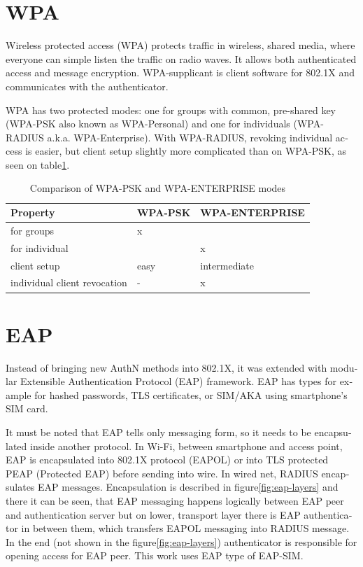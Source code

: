 \documentclass[12pt,a4paper,english]{tutthesis}
\begin{document}
\begin{otherlanguage}{english}
\section{WPA}
\label{sec-2-3}

Wireless protected access (WPA) protects traffic in wireless,
shared media, where everyone can simple listen the traffic on
radio waves. It allows both authenticated access and message
encryption.
WPA-supplicant is client software for 802.1X and communicates with the authenticator.

WPA has two protected modes: one for groups with common, pre-shared
key (WPA-PSK also known as WPA-Personal) and one for individuals
(WPA-RADIUS a.k.a. WPA-Enterprise).  With WPA-RADIUS, revoking
individual access is easier, but client setup slightly more
complicated than on WPA-PSK, as seen on table\ref{psk-enterprise}.

\begin{table}[htb]
\caption{\label{psk-enterprise}Comparison of WPA-PSK and WPA-ENTERPRISE modes}
\centering
\begin{tabular}{lll}
Property & WPA-PSK & WPA-ENTERPRISE\\
\hline
for groups & x & \\
for individual &  & x\\
client setup & easy & intermediate\\
individual client revocation & - & x\\
\hline
\end{tabular}
\end{table}

\section{EAP}
\label{sec-2-4}

Instead of bringing new AuthN methods into 802.1X, it was 
extended with modular Extensible Authentication Protocol (EAP) 
framework\cite{rfc5247}. EAP has types for example for hashed
passwords, TLS certificates, or SIM/AKA using smartphone's SIM card.

It must be noted that EAP tells only messaging form, so it needs
to be encapsulated inside another protocol.  In Wi-Fi, between
smartphone and access point, EAP is encapsulated into 802.1X protocol
(EAPOL) or into TLS protected PEAP (Protected EAP)\cite{peap} before
sending into wire. In wired net, RADIUS encapsulates EAP
messages. Encapsulation is described in figure\ref{fig:eap-layers}
and there it can be seen, that 
EAP messaging happens logically between EAP peer and authentication
server but on lower, transport layer there is EAP authenticator in
between them, which transfers EAPOL messaging into RADIUS message.
In the end (not shown in the figure\ref{fig:eap-layers}) authenticator is
responsible for opening access for EAP peer. This work uses EAP type of EAP-SIM.





\end{otherlanguage}
\end{document}

